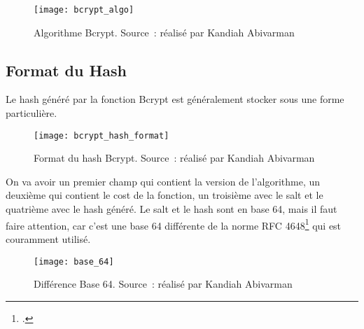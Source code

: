 \begin{figure}[tbph!]
	\centering
	\texttt{[image: bcrypt\_algo]}
	\caption[Algorithme Bcrypt]{Algorithme Bcrypt. Source : réalisé par Kandiah Abivarman}
	\label{fig:bcrypt_algo}
\end{figure}

\newpage

\subsection{Format du Hash}

Le hash généré par la fonction Bcrypt est généralement stocker sous une forme particulière. 

\begin{figure}[tbph!]
	\centering
	\texttt{[image: bcrypt\_hash\_format]}
	\caption[Format du hash Bcrypt]{Format du hash Bcrypt. Source : réalisé par Kandiah Abivarman}
	\label{fig:bcrypt_hash_format}
\end{figure}

On va avoir un premier champ qui contient la version de l'algorithme, un deuxième qui contient le cost de la fonction, un troisième avec le salt et le quatrième avec le hash généré. 
Le salt et le hash sont en base 64, mais il faut faire attention, car c'est une base 64 différente de la norme RFC 4648\footcite{josefsson_base16_2006} qui est couramment utilisé.

\begin{figure}[tbph!]
	\centering
	\texttt{[image: base\_64]}
	\caption[Différence Base 64]{Différence Base 64. Source : réalisé par Kandiah Abivarman}
	\label{fig:base_64}
\end{figure}
